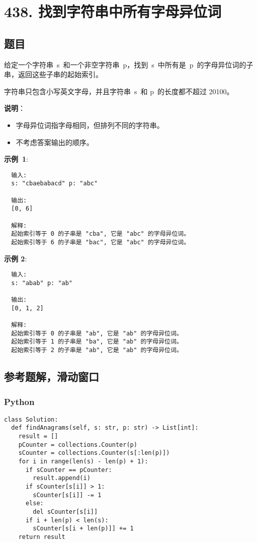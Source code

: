 \newpage
\section{438. 找到字符串中所有字母异位词}
\label{leetcode:438}

\subsection{题目}

给定一个字符串 s 和一个非空字符串 p，找到 s 中所有是 p 的字母异位词的子串，返回这些子串的起始索引。

字符串只包含小写英文字母，并且字符串 s 和 p 的长度都不超过 20100。

\textbf{说明}：

\begin{itemize}
  \item 字母异位词指字母相同，但排列不同的字符串。
  \item 不考虑答案输出的顺序。
\end{itemize}

\textbf{示例 1}:

\begin{verbatim}
  输入:
  s: "cbaebabacd" p: "abc"

  输出:
  [0, 6]

  解释:
  起始索引等于 0 的子串是 "cba", 它是 "abc" 的字母异位词。
  起始索引等于 6 的子串是 "bac", 它是 "abc" 的字母异位词。
\end{verbatim}

\textbf{示例 2}:

\begin{verbatim}
  输入:
  s: "abab" p: "ab"

  输出:
  [0, 1, 2]

  解释:
  起始索引等于 0 的子串是 "ab", 它是 "ab" 的字母异位词。
  起始索引等于 1 的子串是 "ba", 它是 "ab" 的字母异位词。
  起始索引等于 2 的子串是 "ab", 它是 "ab" 的字母异位词。
\end{verbatim}

\subsection{参考题解，滑动窗口}

\subsubsection{Python}

\begin{verbatim}
class Solution:
  def findAnagrams(self, s: str, p: str) -> List[int]:
    result = []
    pCounter = collections.Counter(p)
    sCounter = collections.Counter(s[:len(p)])
    for i in range(len(s) - len(p) + 1):
      if sCounter == pCounter:
        result.append(i)
      if sCounter[s[i]] > 1:
        sCounter[s[i]] -= 1
      else:
        del sCounter[s[i]]
      if i + len(p) < len(s):
        sCounter[s[i + len(p)]] += 1
    return result
\end{verbatim}
